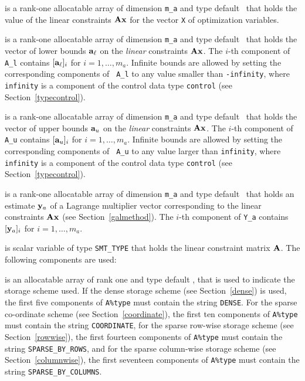 \documentclass{galahad}
\begin{document}
\begin{description}
 is a rank-one allocatable array of dimension {\tt m\_a}
and type default \realdp\ that holds the value of the linear
constraints ${\mathbf{A}}{\mathbf{x}}$ for the vector {\tt X} of optimization variables.

 is a rank-one allocatable array of dimension {\tt m\_a}
and type default \realdp\ that holds the vector of lower bounds
${\mathbf{a}}_\ell$ on the {\em linear} constraints ${\mathbf{A}}{\mathbf{x}}$. The $i$-th component of
{\tt A\_l} contains $[{\mathbf{a}}_\ell]_i$ for $i = 1, \ldots , m_a$.  Infinite
bounds are allowed by setting the corresponding components of {\tt
  A\_l} to any value smaller than {\tt -infinity}, where {\tt
  infinity} is a component of the control data type {\tt control} (see
Section~\ref{typecontrol}).

  is a rank-one allocatable array of dimension {\tt m\_a}
and type default \realdp\ that holds the vector of upper bounds
${\mathbf{a}}_u$ on the {\em linear} constraints ${\mathbf{A}}{\mathbf{x}}$. The $i$-th component of
{\tt A\_u} contains $[{\mathbf{a}}_u]_i$ for $i = 1, \ldots , m_a$.  Infinite
bounds are allowed by setting the corresponding components of {\tt
  A\_u} to any value larger than {\tt infinity}, where {\tt
  infinity} is a component of the control data type {\tt control} (see
Section~\ref{typecontrol}).

 is a rank-one allocatable array of dimension {\tt m\_a} and type
default \realdp\ that holds an estimate ${\mathbf{y}}_a$ of a Lagrange
multiplier vector corresponding to the linear constraints ${\mathbf{A}}{\mathbf{x}}$ (see Section~\ref{galmethod}).
The $i$-th component of {\tt Y\_a} contains $[{\mathbf{y}}_a]_{i}$ for $i = 1,
\ldots , m_a$.


 is scalar variable of type {\tt SMT\_TYPE}
that holds the linear constraint matrix ${\mathbf{A}}$. The following components
are used:

\begin{description}

 is an allocatable array of rank one and type default
\character, that
is used to indicate the storage scheme used. If the dense storage scheme
(see Section~\ref{dense}) is used,
the first five components of {\tt A\%type} must contain the
string {\tt DENSE}.
For the sparse co-ordinate scheme (see Section~\ref{coordinate}),
the first ten components of {\tt A\%type} must contain the
string {\tt COORDINATE},
for the sparse row-wise storage scheme (see Section~\ref{rowwise}),
the first fourteen components of {\tt A\%type} must contain the
string {\tt SPARSE\_BY\_ROWS},
and for the sparse column-wise storage scheme (see Section~\ref{columnwise}),
the first seventeen components of {\tt A\%type} must contain the
string {\tt SPARSE\_BY\_COLUMNS}.


\end{description}
\end{description}
\end{document}
